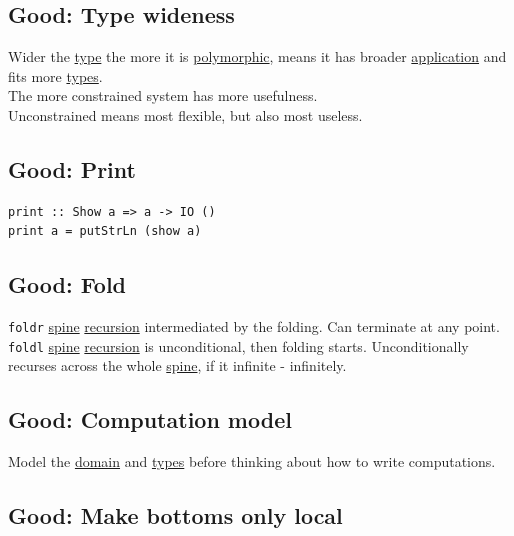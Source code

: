 \documentclass[11pt]{article}
\begin{document}
\subsection{\label{org55c7951}Good: Type wideness}
\label{sec:org5f40153}
Wider the \hyperref[orgc4aea2f]{type} the more it is \hyperref[orgac4d581]{polymorphic}, means it has broader \hyperref[org2b89e66]{application} and fits more \hyperref[org4209edd]{types}.\\

The more constrained system has more usefulness.\\

Unconstrained means most flexible, but also most useless.\\

\subsection{\label{orgf72b5b6}Good: Print}
\label{sec:org19b564f}
\begin{verbatim}
print :: Show a => a -> IO ()
print a = putStrLn (show a)
\end{verbatim}

\subsection{\label{org4a8a23f}Good: Fold}
\label{sec:orgf8fe6a7}
\texttt{foldr} \hyperref[org242c92e]{spine} \hyperref[orgf98f6ca]{recursion} intermediated by the folding. Can terminate at any point.\\
\texttt{foldl} \hyperref[org242c92e]{spine} \hyperref[orgf98f6ca]{recursion} is unconditional, then folding starts. Unconditionally recurses across the whole \hyperref[org242c92e]{spine}, if it infinite - infinitely.\\

\subsection{\label{org0d6ad97}Good: Computation model}
\label{sec:org92feaac}
Model the \hyperref[org494b48a]{domain} and \hyperref[org4209edd]{types} before thinking about how to write computations.\\

\subsection{\label{org6fcd348}Good: Make bottoms only local}
\label{sec:org508b783}
\end{document}
